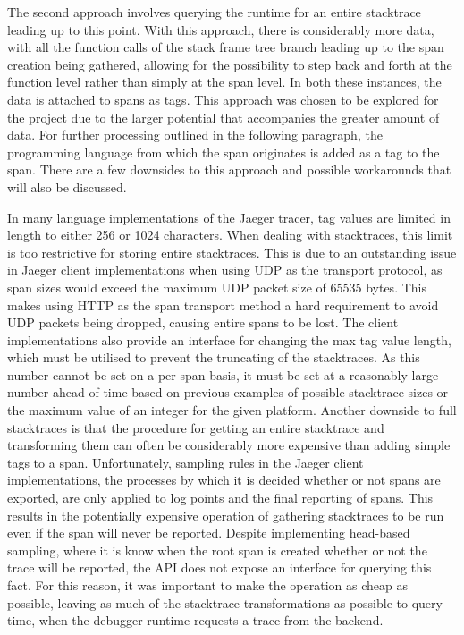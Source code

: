 \documentclass[12pt,pdftex,titlepage]{report}
\begin{document}
                    The second approach involves querying the runtime for an entire stacktrace leading up to this point. With this approach, there is considerably more data, with all the function
                    calls of the stack frame tree branch leading up to the span creation being gathered, allowing for the possibility to step back and forth at the function level rather than simply
                    at the span level. In both these instances, the data is attached to spans as tags. This approach was chosen to be explored for the project due to the larger potential that accompanies
                    the greater amount of data. For further processing outlined in the following paragraph, the programming language from which the span originates is added as a tag to the span.
                    There are a few downsides to this approach and possible workarounds that will also be discussed.
                    
                    In many language implementations of the Jaeger tracer, tag values are limited in length to either 256 or 1024 characters. When dealing with stacktraces, this limit is too 
                    restrictive for storing entire stacktraces. This is due to an outstanding issue in Jaeger client implementations when using UDP as the transport protocol, as span sizes
                    would exceed the maximum UDP packet size of 65535 bytes\cite{udptagsize}. This makes using HTTP as the span transport method a hard requirement to avoid UDP packets being
                    dropped, causing entire spans to be lost. The client implementations also provide an interface for changing the max tag value length, which must be utilised to prevent the truncating
                    of the stacktraces. As this number cannot be set on a per-span basis, it must be set at a reasonably large number ahead of time based on previous examples of possible stacktrace sizes
                    or the maximum value of an integer for the given platform. Another downside to full stacktraces is that the procedure for getting an entire stacktrace and transforming them can often 
                    be considerably more expensive than adding simple tags to a span. Unfortunately, sampling rules in the Jaeger client implementations, the processes by which it is decided whether or 
                    not spans are exported, are only applied to log points and the final reporting of spans. This results in the potentially expensive operation of gathering stacktraces to be run even if 
                    the span will never be reported. Despite implementing head-based sampling, where it is know when the root span is created whether or not the trace will be reported, the API does not 
                    expose an interface for querying this fact. For this reason, it was important to make the operation as cheap as possible, leaving as much of the stacktrace transformations as possible to 
                    query time, when the debugger runtime requests a trace from the backend.
\end{document}
